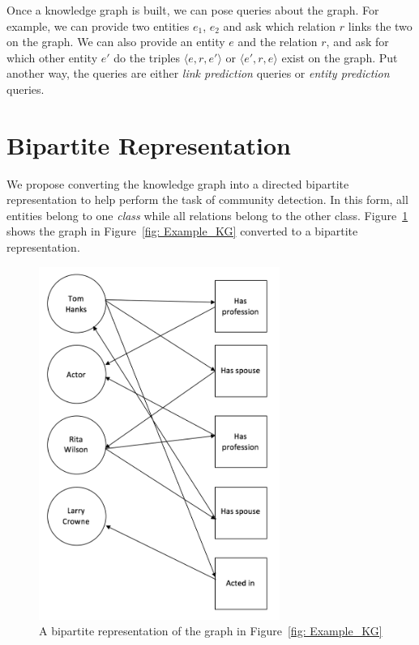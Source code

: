 \documentclass[12pt]{article}
\begin{document}
Once a knowledge graph is built, we can pose queries about the graph. For
example, we can provide two entities $e_1$, $e_2$ and ask which relation $r$
links the two on the graph. We can also provide an entity $e$ and the relation
$r$, and ask for which other entity $e'$ do the triples $\langle e,r,e' \rangle$
or $\langle e',r,e \rangle$ exist on the graph. Put another way, the queries are
either \textit{link prediction} queries or \textit{entity prediction} queries.

\section{Bipartite Representation}
\label{Bipartite Representation}

We propose converting the knowledge graph into a directed bipartite
representation to help perform the task of community detection. In this form,
all entities belong to one \textit{class} while all relations belong to the
other class. Figure~\ref{fig: Bipartite_KG} shows the graph in Figure~\ref{fig: Example_KG}
converted to a bipartite representation.

\begin{figure}
    \centering
    \includegraphics[width=0.7\textwidth,keepaspectratio]{figures/Bipartite_KG.png}
    \caption{A bipartite representation of the graph in Figure~\ref{fig: Example_KG} }
    \label{fig: Bipartite_KG}
\end{figure}
\end{document}
